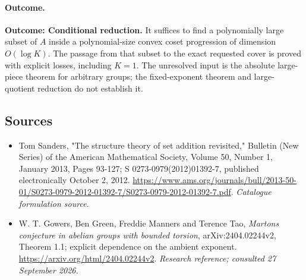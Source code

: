 \documentclass[11pt,a4paper]{article}
\numberwithin{equation}{section}
\begin{document}
\paragraph{Outcome.}
\textbf{Outcome: Conditional reduction.}
It suffices to find a polynomially large subset of $A$ inside a polynomial-size convex coset progression of dimension $O(\log K)$. The passage from that subset to the exact requested cover is proved with explicit losses, including $K=1$. The unresolved input is the absolute large-piece theorem for arbitrary groups; the fixed-exponent theorem and large-quotient reduction do not establish it.

\subsection{Sources}
\begin{itemize}\raggedright
\item[\textnormal{[S1]}]\hypertarget{source:195:1}{} Tom Sanders, "The structure theory of set addition revisited," Bulletin (New Series) of the American Mathematical Society, Volume 50, Number 1, January 2013, Pages 93-127; S 0273-0979(2012)01392-7, published electronically October 2, 2012.
\url{https://www.ams.org/journals/bull/2013-50-01/S0273-0979-2012-01392-7/S0273-0979-2012-01392-7.pdf}.
{\small\textit{Catalogue formulation source.}}
\item[\textnormal{[E1]}]\hypertarget{extra:195:1}{} W. T. Gowers, Ben Green, Freddie Manners and Terence Tao, \emph{Marton\textquotesingle s conjecture in abelian groups with bounded torsion}, arXiv:2404.02244v2, Theorem 1.1; explicit dependence on the ambient exponent.
\url{https://arxiv.org/html/2404.02244v2}.
{\small\textit{Research reference; consulted 27 September 2026.}}
\end{itemize}
\end{document}
